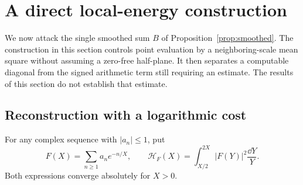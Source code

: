 \section{A direct local-energy construction}\label{sec:local-energy}

We now attack the single smoothed sum \(B\) of
Proposition~\ref{prop:smoothed}. The construction in this section
controls point evaluation by a neighboring-scale mean square without
assuming a zero-free half-plane. It then separates a computable
diagonal from the signed arithmetic term still requiring an estimate.
The results of this section do not establish that estimate.

\subsection{Reconstruction with a logarithmic cost}

For any complex sequence with \(|a_n|\le1\), put
\[
 F(X)=\sum_{n\ge1}a_ne^{-n/X},\qquad
 \mathcal H_F(X)=\int_{X/2}^{2X}|F(Y)|^2\frac{\dd Y}{Y}.
\]
Both expressions converge absolutely for \(X>0\).

